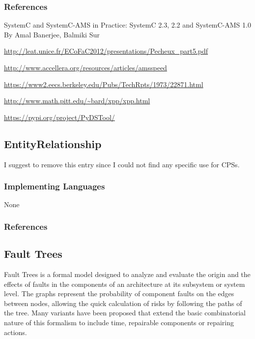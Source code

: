 \subsubsection{References}

SystemC and SystemC-AMS in Practice: SystemC 2.3, 2.2 and SystemC-AMS 1.0
By Amal Banerjee, Balmiki Sur


\url{http://leat.unice.fr/ECoFaC2012/presentations/Pecheux_part5.pdf}

\url{http://www.accellera.org/resources/articles/amsspeed}

\url{https://www2.eecs.berkeley.edu/Pubs/TechRpts/1973/22871.html}

\url{http://www.math.pitt.edu/~bard/xpp/xpp.html}

\url{https://pypi.org/project/PyDSTool/}


\subsection{EntityRelationship}
\label{subsecF:EntityRelationship}


I suggest to remove this entry since I could not find any specific use for CPSs.

\subsubsection{Implementing Languages}

None


\subsubsection{References}


\subsection{Fault Trees}

Fault Trees is a formal model designed to analyze and evaluate the origin and the effects of faults in the components of an architecture at its subsystem or system level. 
The graphs represent the probability of component faults on the edges between nodes, allowing the quick calculation of risks by following the paths of the tree.
Many variants have been proposed that extend the basic combinatorial nature of this formalism to include time, repairable components or repairing actions.

